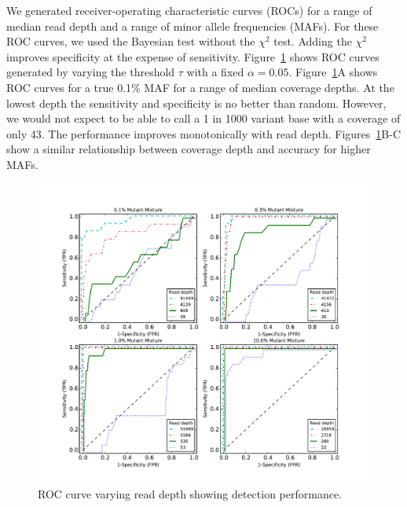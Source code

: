 \documentclass[11pt,reqno]{amsart}
\begin{document}
We generated receiver-operating characteristic curves (ROCs) for a range of median read depth and a range of minor allele frequencies (MAFs). For these ROC curves, we used the Bayesian test without the $\chi^2$ test. Adding the $\chi^2$ improves specificity at the expense of sensitivity. Figure~\ref{fig:ROC} shows ROC curves generated by varying the threshold $\tau$ with a fixed $\alpha=0.05$. Figure~\ref{fig:ROC}A shows ROC curves for a true 0.1\% MAF for a range of median coverage depths. At the lowest depth the sensitivity and specificity is no better than random. However, we would not expect to be able to call a 1 in 1000 variant base with a coverage of only 43. The performance improves monotonically with read depth. Figures~\ref{fig:ROC}B-C show a similar relationship between coverage depth and accuracy for higher MAFs.

\begin{figure}[htbp]
\begin{center}
\includegraphics[width=120mm]{pdf_figs/ROC_without_chi2.pdf}
\caption{ROC curve varying read depth showing detection performance.}
\label{fig:ROC}
\end{center}
\end{figure}

%
\end{document}
